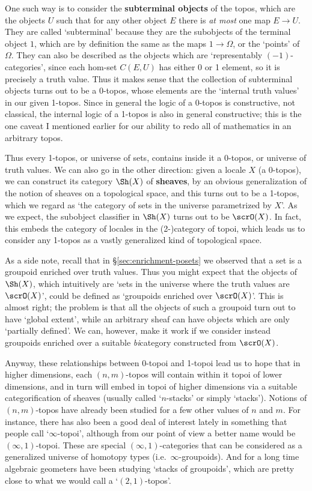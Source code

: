 \documentclass{amsart}
\begin{document}
One such way is to consider the \textbf{subterminal objects} of the
topos, which are the objects $U$ such that for any other object $E$
there is \emph{at most} one map $E\to U$.  They are called
`subterminal' because they are the subobjects of the terminal object
$1$, which are by definition the same as the maps $1\to \Omega$, or
the `points' of $\Omega$.  They can also be described as the objects
which are `representably $(-1)$-categories', since each hom-set
$C(E,U)$ has either 0 or 1 element, so it is precisely a truth value.
Thus it makes sense that the collection of subterminal objects turns
out to be a 0-topos, whose elements are the `internal truth values' in
our given 1-topos.  Since in general the logic of a 0-topos is
constructive, not classical, the internal logic of a 1-topos is also
in general constructive; this is the one caveat I mentioned earlier
for our ability to redo all of mathematics in an arbitrary topos.

Thus every 1-topos, or universe of sets, contains inside it a 0-topos,
or universe of truth values.  We can also go in the other direction:
given a locale $X$ (a 0-topos), we can construct its category $\Sh(X)$
of \textbf{sheaves}, by an obvious generalization of the notion of
sheaves on a topological space, and this turns out to be a 1-topos,
which we regard as `the category of sets in the universe parametrized
by $X$'.  As we expect, the subobject classifier in $\Sh(X)$ turns out
to be $\scrO(X)$.  In fact, this embeds the category of locales in the
(2-)category of topoi, which leads us to consider any 1-topos as a
vastly generalized kind of topological space.

As a side note, recall that in \S\ref{sec:enrichment-posets} we
observed that a set is a groupoid enriched over truth values.  Thus
you might expect that the objects of $\Sh(X)$, which intuitively are
`sets in the universe where the truth values are $\scrO(X)$', could be
defined as `groupoids enriched over $\scrO(X)$'.  This is almost
right; the problem is that all the objects of such a groupoid turn out
to have `global extent', while an arbitrary sheaf can have objects
which are only `partially defined'.  We can, however, make it work if
we consider instead groupoids enriched over a suitable
\emph{bi}category constructed from $\scrO(X)$.

Anyway, these relationships between 0-topoi and 1-topoi lead us to
hope that in higher dimensions, each $(n,m)$-topos will contain within
it topoi of lower dimensions, and in turn will embed in topoi of
higher dimensions via a suitable categorification of sheaves (usually
called `$n$-stacks' or simply `stacks').  Notions of $(n,m)$-topos
have already been studied for a few other values of $n$ and $m$.  For
instance, there has also been a good deal of interest lately in
something that people call `$\infty$-topoi', although from our point
of view a better name would be $(\infty,1)$-topoi.  These are special
$(\infty,1)$-categories that can be considered as a generalized
universe of homotopy types (i.e.\ $\infty$-groupoids).  And for a long
time algebraic geometers have been studying `stacks of groupoids',
which are pretty close to what we would call a `$(2,1)$-topos'.
\end{document}
